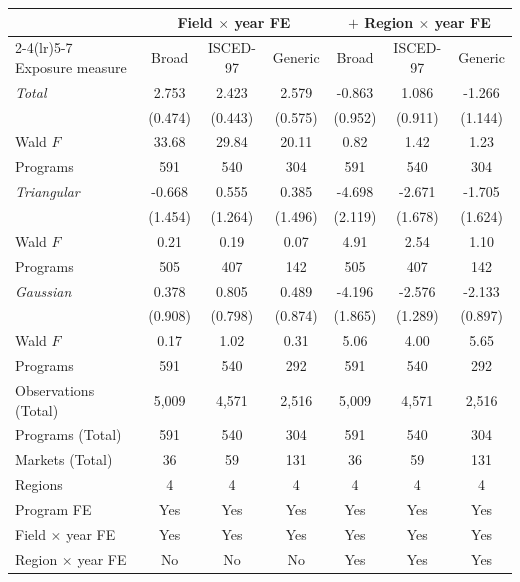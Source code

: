 \begin{tabular}{lcccccc}
\toprule
 & \multicolumn{3}{c}{Field \(\times\) year FE} & \multicolumn{3}{c}{\(+\) Region \(\times\) year FE} \\
\cmidrule(lr){2-4}\cmidrule(lr){5-7}
Exposure measure & Broad & ISCED-97 & Generic & Broad & ISCED-97 & Generic \\
\midrule
\textit{Total} &  2.753\sym{***} &  2.423\sym{***} &  2.579\sym{***} & -0.863 &  1.086 & -1.266 \\
 & (0.474) & (0.443) & (0.575) & (0.952) & (0.911) & (1.144) \\
\quad Wald \(F\) & 33.68 & 29.84 & 20.11 &  0.82 &  1.42 &  1.23 \\
\quad Programs &       591 &       540 &       304 &       591 &       540 &       304 \\
\addlinespace
\textit{Triangular} & -0.668 &  0.555 &  0.385 & -4.698\sym{**} & -2.671 & -1.705 \\
 & (1.454) & (1.264) & (1.496) & (2.119) & (1.678) & (1.624) \\
\quad Wald \(F\) &  0.21 &  0.19 &  0.07 &  4.91 &  2.54 &  1.10 \\
\quad Programs &       505 &       407 &       142 &       505 &       407 &       142 \\
\addlinespace
\textit{Gaussian} &  0.378 &  0.805 &  0.489 & -4.196\sym{**} & -2.576\sym{*} & -2.133\sym{**} \\
 & (0.908) & (0.798) & (0.874) & (1.865) & (1.289) & (0.897) \\
\quad Wald \(F\) &  0.17 &  1.02 &  0.31 &  5.06 &  4.00 &  5.65 \\
\quad Programs &       591 &       540 &       292 &       591 &       540 &       292 \\
\midrule
Observations (Total) &     5,009 &     4,571 &     2,516 &     5,009 &     4,571 &     2,516 \\
Programs (Total) &       591 &       540 &       304 &       591 &       540 &       304 \\
Markets (Total) &        36 &        59 &       131 &        36 &        59 &       131 \\
Regions &         4 &         4 &         4 &         4 &         4 &         4 \\
Program FE & Yes & Yes & Yes & Yes & Yes & Yes \\
Field \(\times\) year FE & Yes & Yes & Yes & Yes & Yes & Yes \\
Region \(\times\) year FE & No & No & No & Yes & Yes & Yes \\
\bottomrule
\end{tabular}
